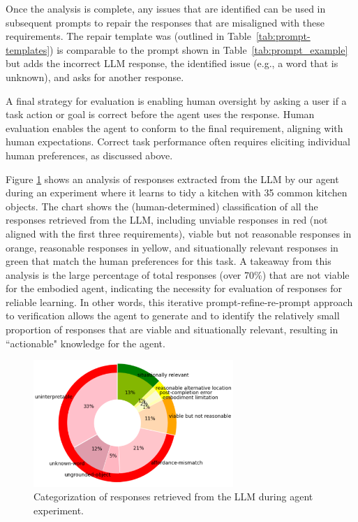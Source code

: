\documentclass[letterpaper]{article} %
\begin{document}
Once the analysis is complete, any issues that are identified can be used in subsequent prompts to repair the responses that are misaligned with these requirements. The repair template was (outlined in Table~\ref{tab:prompt-templates}) is comparable to the prompt shown in Table~\ref{tab:prompt_example} but adds the incorrect LLM response, the identified issue (e.g., a word that is unknown), and asks for another response.

A final strategy for evaluation is enabling human oversight by asking a user if a task action or goal is correct before the agent uses the response. Human evaluation enables the agent to conform to the final requirement, aligning with human expectations. Correct task performance often requires eliciting individual human preferences, as discussed above.

Figure \ref{fig:response_categories} shows an analysis of responses extracted from the LLM by our agent during an experiment where it learns to tidy a kitchen with 35 common kitchen objects. The chart shows the (human-determined) classification of all the responses retrieved from the LLM, including unviable responses in red (not aligned with the first three requirements), viable but not reasonable responses in orange, reasonable responses in yellow, and situationally relevant responses in green that match the human preferences for this task. A takeaway from this analysis is the large percentage of total responses (over 70\%) that are not viable for the embodied agent, indicating the necessity for evaluation of responses for reliable learning. In other words, this iterative prompt-refine-re-prompt approach to verification allows the agent to generate and to identify the relatively small proportion of responses that are viable and situationally relevant, resulting in ``actionable" knowledge for the agent.

\begin{figure}[t]
\centering
\includegraphics[width=0.9\columnwidth,height=1.8900000000000001in ]{figures/VerificationTypicalObjectsStandAloneResponseCategoriesSTARSManualCrop.png}
\caption{Categorization of responses retrieved from the LLM during agent experiment.}
\label{fig:response_categories}
\end{figure}
\end{document}
